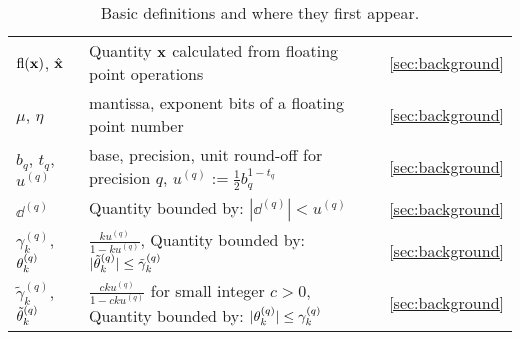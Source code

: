 \begin{table}[H]
\begin{tabular}{|m{}|m{10.6cm}|c|}
		\hline
		$\mathrm{fl}(\mathbf{x})$, $\hat{\mathbf{x}}$ & Quantity $\mathbf{x}$ calculated from floating point operations & \ref{sec:background} \\
		$\mu$, $\eta$  & mantissa, exponent bits of a floating point number & \ref{sec:background} \\
		$b_q$, $t_q$, $u^{(q)}$ & base, precision, unit round-off for precision $q$,  $u^{(q)}:=\frac{1}{2}b_q^{1-t_q}$& \ref{sec:background}\\
		$\dd^{(q)}$ &Quantity bounded by: $|\dd^{(q)}| < u^{(q)}$ &  \ref{sec:background} \\
		$\gamma^{(q)}_{k}$,  $\theta^{(q)}_{k}$& $\frac{ku^{(q)}}{1-ku^{(q)}}$, Quantity bounded by: $|\tilde{\theta}^{(q)}_{k}|\leq\tilde{\gamma}^{(q)}_{k}$ &  \ref{sec:background} \\
		$\tilde{\gamma}^{(q)}_{k}$,  $\tilde{\theta}^{(q)}_{k}$& $\frac{cku^{(q)}}{1-cku^{(q)}}$ for small integer $c>0$, Quantity bounded by: $|\theta^{(q)}_{k}|\leq\gamma^{(q)}_{k}$ &  \ref{sec:background} \\
		\hline
	\end{tabular}
	\caption{Basic definitions and where they first appear.}
	\label{table:notation}
\end{table}